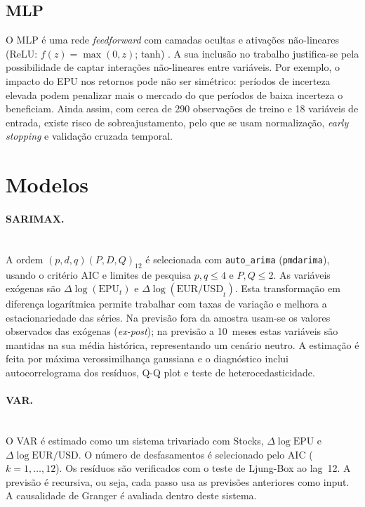 \documentclass[12pt,a4paper]{article}
\begin{document}
\subsection{MLP}

O MLP é uma rede \textit{feedforward} com camadas ocultas e ativações não-lineares (ReLU: $f(z){=}\max(0,z)$; tanh) \citep{haykin2009neural}. A sua inclusão no trabalho justifica-se pela possibilidade de captar interações não-lineares entre variáveis. Por exemplo, o impacto do EPU nos retornos pode não ser simétrico: períodos de incerteza elevada podem penalizar mais o mercado do que períodos de baixa incerteza o beneficiam. Ainda assim, com cerca de 290 observações de treino e 18 variáveis de entrada, existe risco de sobreajustamento, pelo que se usam normalização, \textit{early stopping} e validação cruzada temporal.

\section{Modelos}

\paragraph{SARIMAX.} \mbox{}\\ A ordem $(p,d,q)(P,D,Q)_{12}$ é selecionada com \texttt{auto\_arima} (\texttt{pmdarima}), usando o critério AIC e limites de pesquisa $p,q \leq 4$ e $P,Q \leq 2$. As variáveis exógenas são $\Delta\log(\text{EPU}_t)$ e $\Delta\log(\text{EUR/USD}_t)$. Esta transformação em diferença logarítmica permite trabalhar com taxas de variação e melhora a estacionariedade das séries. Na previsão fora da amostra usam-se os valores observados das exógenas (\textit{ex-post}); na previsão a 10~meses estas variáveis são mantidas na sua média histórica, representando um cenário neutro. A estimação é feita por máxima verossimilhança gaussiana e o diagnóstico inclui autocorrelograma dos resíduos, Q-Q plot e teste de heterocedasticidade.

\paragraph{VAR.} \mbox{}\\ O VAR é estimado como um sistema trivariado com Stocks, $\Delta\log\text{EPU}$ e $\Delta\log\text{EUR/USD}$. O número de desfasamentos é selecionado pelo AIC ($k = 1, \ldots, 12$). Os resíduos são verificados com o teste de Ljung-Box ao lag~12. A previsão é recursiva, ou seja, cada passo usa as previsões anteriores como input. A causalidade de Granger é avaliada dentro deste sistema.
\end{document}
